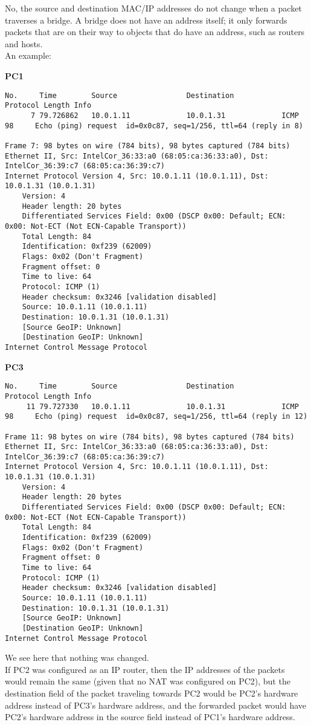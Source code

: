 No, the source and destination MAC/IP addresses do not change when a packet traverses a bridge.
A bridge does not have an address itself; it only forwards packets that are on their way to objects
that do have an address, such as routers and hosts. \\

An example:

\textbf{PC1}
\begin{lstlisting}
No.     Time        Source                Destination           Protocol Length Info
      7 79.726862   10.0.1.11             10.0.1.31             ICMP     98     Echo (ping) request  id=0x0c87, seq=1/256, ttl=64 (reply in 8)

Frame 7: 98 bytes on wire (784 bits), 98 bytes captured (784 bits)
Ethernet II, Src: IntelCor_36:33:a0 (68:05:ca:36:33:a0), Dst: IntelCor_36:39:c7 (68:05:ca:36:39:c7)
Internet Protocol Version 4, Src: 10.0.1.11 (10.0.1.11), Dst: 10.0.1.31 (10.0.1.31)
    Version: 4
    Header length: 20 bytes
    Differentiated Services Field: 0x00 (DSCP 0x00: Default; ECN: 0x00: Not-ECT (Not ECN-Capable Transport))
    Total Length: 84
    Identification: 0xf239 (62009)
    Flags: 0x02 (Don't Fragment)
    Fragment offset: 0
    Time to live: 64
    Protocol: ICMP (1)
    Header checksum: 0x3246 [validation disabled]
    Source: 10.0.1.11 (10.0.1.11)
    Destination: 10.0.1.31 (10.0.1.31)
    [Source GeoIP: Unknown]
    [Destination GeoIP: Unknown]
Internet Control Message Protocol
\end{lstlisting}

\textbf{PC3}
\begin{lstlisting}
No.     Time        Source                Destination           Protocol Length Info
     11 79.727330   10.0.1.11             10.0.1.31             ICMP     98     Echo (ping) request  id=0x0c87, seq=1/256, ttl=64 (reply in 12)

Frame 11: 98 bytes on wire (784 bits), 98 bytes captured (784 bits)
Ethernet II, Src: IntelCor_36:33:a0 (68:05:ca:36:33:a0), Dst: IntelCor_36:39:c7 (68:05:ca:36:39:c7)
Internet Protocol Version 4, Src: 10.0.1.11 (10.0.1.11), Dst: 10.0.1.31 (10.0.1.31)
    Version: 4
    Header length: 20 bytes
    Differentiated Services Field: 0x00 (DSCP 0x00: Default; ECN: 0x00: Not-ECT (Not ECN-Capable Transport))
    Total Length: 84
    Identification: 0xf239 (62009)
    Flags: 0x02 (Don't Fragment)
    Fragment offset: 0
    Time to live: 64
    Protocol: ICMP (1)
    Header checksum: 0x3246 [validation disabled]
    Source: 10.0.1.11 (10.0.1.11)
    Destination: 10.0.1.31 (10.0.1.31)
    [Source GeoIP: Unknown]
    [Destination GeoIP: Unknown]
Internet Control Message Protocol
\end{lstlisting}

We see here that nothing was changed.\\

If PC2 was configured as an IP router, then the IP addresses of the packets would remain the same
(given that no NAT was configured on PC2), but the destination field of the packet traveling towards PC2 would be PC2's hardware address instead of PC3's hardware address, and the forwarded packet would have PC2's hardware address in the source field instead of PC1's hardware address.
